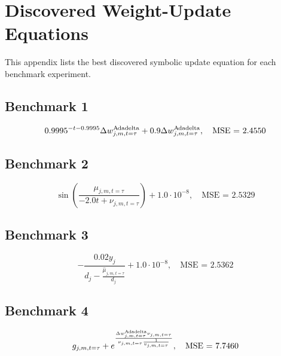 
\appendix
\section{Discovered Weight-Update Equations}
\label{app:discovered-update-equations}

This appendix lists the best discovered symbolic update equation for each benchmark experiment.

\subsection*{Benchmark 1}
\begin{equation}
\label{eq:benchmark-1}
{0.9995}^{- t - 0.9995} \Delta w^{\text{A}\hspace{-.018cm}\text{dadelta}}_{j, m, t=\tau} + 0.9 \Delta w^{\text{A}\hspace{-.018cm}\text{dadelta}}_{j, m, t=\tau}, \quad \text{MSE = } 2.4550
\end{equation}


\subsection*{Benchmark 2}
\begin{equation}
\label{eq:benchmark-2}
\sin{\left(\frac{\mu_{j,m,t=\tau}}{- 2.0 t + \nu_{j,m,t=\tau}} \right)} + 1.0 \cdot 10^{-8}, \quad \text{MSE = } 2.5329
\end{equation}


\subsection*{Benchmark 3}
\begin{equation}
\label{eq:benchmark-3}
- \frac{0.02 y_{j}}{d_{j} - \frac{\widehat{\mu}_{j,m,t=\tau}}{d_{j}}} + 1.0 \cdot 10^{-8}, \quad \text{MSE = } 2.5362
\end{equation}


\subsection*{Benchmark 4}
\begin{equation}
\label{eq:benchmark-4}
g_{j, m, t=\tau} + e^{\frac{\Delta w^{\text{A}\hspace{-.018cm}\text{dadelta}}_{j, m, t=\tau} \nu_{j,m,t=\tau}}{\nu_{j,m,t=\tau} \frac{1}{v_{j, m, t=\tau}}}}, \quad \text{MSE = } 7.7460
\end{equation}


